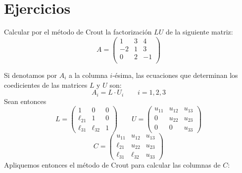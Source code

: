 \section{Ejercicios}
\begin{ejer}
Calcular por el método de Crout la factorización $LU$ de la siguiente matriz:
$$A=\begin{pmatrix}
1&3&4\\
-2&1&3\\
0&2&-1\\
\end{pmatrix}$$
\end{ejer}
\begin{sol}
Si denotamos por $A_i$ a la columna $i$-ésima, las ecuaciones que determinan los coedicientes de las matrices $L$ y $U$ son:
$$A_i=L\cdot U_i\qquad i=1,2,3$$
Sean entonces
$$L=\begin{pmatrix}
1&0&0\\
\ell_{21}&1&0\\
\ell_{31}&\ell_{32}&1
\end{pmatrix}\qquad U=\begin{pmatrix}
u_{11}&u_{12}&u_{13}\\
0&u_{22}&u_{23}\\
0&0&u_{33}
\end{pmatrix}$$
$$C=\begin{pmatrix}
u_{11}&u_{12}&u_{13}\\
\ell_{21}&u_{22}&u_{23}\\
\ell_{31}&\ell_{32}&u_{33}
\end{pmatrix}$$
Apliquemos entonces el método de Crout para calcular las columnas de $C$:


\end{sol}
